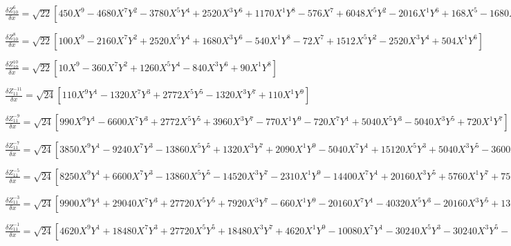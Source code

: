 \documentclass[10pt,landscape]{article}
\begin{document}
\vspace{1.2 mm}
\noindent $ \frac{\delta Z^{6}_{10}}{\delta x} = \sqrt{22} [450X^{9} -4680X^{7}Y^{2} -3780X^{5}Y^{4} +2520X^{3}Y^{6} +1170X^{1}Y^{8} -576X^{7} +6048X^{5}Y^{2} -2016X^{1}Y^{6} +168X^{5} -1680X^{3}Y^{2} +840X^{1}Y^{4}] $

\vspace{1.2 mm}
\noindent $ \frac{\delta Z^{8}_{10}}{\delta x} = \sqrt{22} [100X^{9} -2160X^{7}Y^{2} +2520X^{5}Y^{4} +1680X^{3}Y^{6} -540X^{1}Y^{8} -72X^{7} +1512X^{5}Y^{2} -2520X^{3}Y^{4} +504X^{1}Y^{6}] $

\vspace{1.2 mm}
\noindent $ \frac{\delta Z^{10}_{10}}{\delta x} = \sqrt{22} [10X^{9} -360X^{7}Y^{2} +1260X^{5}Y^{4} -840X^{3}Y^{6} +90X^{1}Y^{8}] $

\vspace{1.2 mm}
\noindent $ \frac{\delta Z^{-11}_{11}}{\delta x} = \sqrt{24} [110X^{9}Y^{1} -1320X^{7}Y^{3} +2772X^{5}Y^{5} -1320X^{3}Y^{7} +110X^{1}Y^{9}] $

\vspace{1.2 mm}
\noindent $ \frac{\delta Z^{-9}_{11}}{\delta x} = \sqrt{24} [990X^{9}Y^{1} -6600X^{7}Y^{3} +2772X^{5}Y^{5} +3960X^{3}Y^{7} -770X^{1}Y^{9} -720X^{7}Y^{1} +5040X^{5}Y^{3} -5040X^{3}Y^{5} +720X^{1}Y^{7}] $

\vspace{1.2 mm}
\noindent $ \frac{\delta Z^{-7}_{11}}{\delta x} = \sqrt{24} [3850X^{9}Y^{1} -9240X^{7}Y^{3} -13860X^{5}Y^{5} +1320X^{3}Y^{7} +2090X^{1}Y^{9} -5040X^{7}Y^{1} +15120X^{5}Y^{3} +5040X^{3}Y^{5} -3600X^{1}Y^{7} +1512X^{5}Y^{1} -5040X^{3}Y^{3} +1512X^{1}Y^{5}] $

\vspace{1.2 mm}
\noindent $ \frac{\delta Z^{-5}_{11}}{\delta x} = \sqrt{24} [8250X^{9}Y^{1} +6600X^{7}Y^{3} -13860X^{5}Y^{5} -14520X^{3}Y^{7} -2310X^{1}Y^{9} -14400X^{7}Y^{1} +20160X^{3}Y^{5} +5760X^{1}Y^{7} +7560X^{5}Y^{1} -5040X^{3}Y^{3} -4536X^{1}Y^{5} -1120X^{3}Y^{1} +1120X^{1}Y^{3}] $

\vspace{1.2 mm}
\noindent $ \frac{\delta Z^{-3}_{11}}{\delta x} = \sqrt{24} [9900X^{9}Y^{1} +29040X^{7}Y^{3} +27720X^{5}Y^{5} +7920X^{3}Y^{7} -660X^{1}Y^{9} -20160X^{7}Y^{1} -40320X^{5}Y^{3} -20160X^{3}Y^{5} +13608X^{5}Y^{1} +15120X^{3}Y^{3} +1512X^{1}Y^{5} -3360X^{3}Y^{1} -1120X^{1}Y^{3} +210X^{1}Y^{1}] $

\vspace{1.2 mm}
\noindent $ \frac{\delta Z^{-1}_{11}}{\delta x} = \sqrt{24} [4620X^{9}Y^{1} +18480X^{7}Y^{3} +27720X^{5}Y^{5} +18480X^{3}Y^{7} +4620X^{1}Y^{9} -10080X^{7}Y^{1} -30240X^{5}Y^{3} -30240X^{3}Y^{5} -10080X^{1}Y^{7} +7560X^{5}Y^{1} +15120X^{3}Y^{3} +7560X^{1}Y^{5} -2240X^{3}Y^{1} -2240X^{1}Y^{3} +210X^{1}Y^{1}] $
\end{document}
